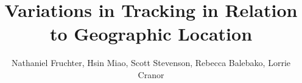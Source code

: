 \documentclass[conference]{IEEEtran}
\begin{document}
%
\title{Variations in Tracking in Relation to Geographic Location}
%
%
%

\author{ Nathaniel Fruchter,
        Hsin Miao,
        Scott Stevenson,
        Rebecca Balebako,
        Lorrie Cranor
        }%
% 
%



% 




\end{document}
